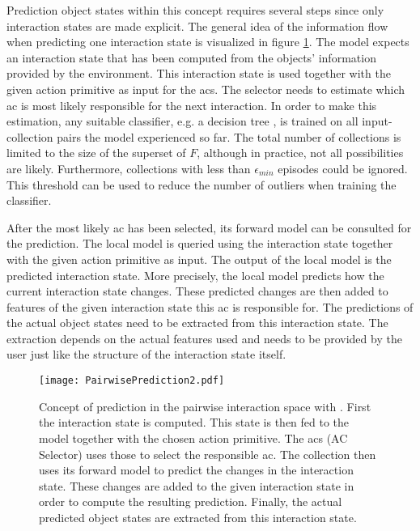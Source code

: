 Prediction object states within this concept requires several steps since only interaction states are made explicit. The general idea of the information flow when predicting one interaction state is visualized in figure \ref{fig:PairPrediction}. The model expects an interaction state that has been computed from the objects' information provided by the environment. This interaction state is used together with the given action primitive as input for the \acrfull{acs}. The selector needs to estimate which \gls{ac} is most likely responsible for the next interaction. In order to make this estimation, any suitable classifier, e.g. a decision tree \cite{decisionTree}, is trained on all input-collection pairs the model experienced so far. 
The total number of collections is limited to the size of the superset of $F$, although in practice, not all possibilities are likely. Furthermore, collections with less than $\epsilon_{min}$ episodes could be ignored. This threshold can be used to reduce the number of outliers when training the classifier. 

After the most likely \gls{ac} has been selected, its forward model can be consulted for the prediction. The local model is queried using the interaction state together with the given action primitive as input. The output of the local model is the predicted interaction state. 
More precisely, the local model predicts how the current interaction state changes. These predicted changes are then added to features of the given interaction state this \gls{ac} is responsible for.
The predictions of the actual object states need to be extracted from this interaction state. The extraction depends on the actual features used and needs to be provided by the user just like the structure of the interaction state itself.

\begin{figure}
	\centering
	\texttt{[image: PairwisePrediction2.pdf]}
	\caption{Concept of prediction in the pairwise interaction space with . First the interaction state is computed. This state is then fed to the model together with the chosen action primitive. The \acrlong{acs} (AC Selector) uses those to select the responsible \gls{ac}. The collection then uses its forward model to predict the changes in the interaction state. These changes are added to the given interaction state in order to compute the resulting prediction. Finally, the actual predicted object states are extracted from this interaction state.} 
	\label{fig:PairPrediction}
\end{figure}

